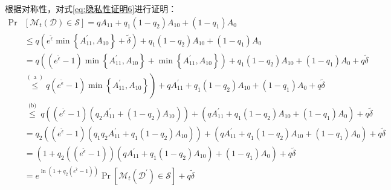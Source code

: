 

{}
根据对称性，对式\ref{eq:隐私性证明6}进行证明：
\begin{equation}
\begin{aligned}
\operatorname{Pr} & {\left[\mathcal{M}_{t}(\mathcal{D}) \in \mathcal{S}\right]=q A_{11}+q_{1}\left(1-q_{2}\right) A_{10}+\left(1-q_{1}\right) A_{0} } \\
& \leq q\left(e^{\tilde{\epsilon}} \min \left\{A_{11}^{\prime}, A_{10}\right\}+\tilde{\delta}\right)+q_{1}\left(1-q_{2}\right) A_{10}+\left(1-q_{1}\right) A_{0} \\
&=q\left(\left(e^{\tilde{\epsilon}}-1\right) \min \left\{A_{11}^{\prime}, A_{10}\right\}+\min \left\{A_{11}^{\prime}, A_{10}\right\}\right)+q_{1}\left(1-q_{2}\right) A_{10}+\left(1-q_{1}\right) A_{0}+q \tilde{\delta} \\
&\left.\stackrel{(\text { a })}{\leq} q\left(e^{\tilde{\epsilon}}-1\right) \min \left\{A_{11}^{\prime}, A_{10}\right\}\right)+q A_{11}^{\prime}+q_{1}\left(1-q_{2}\right) A_{10}+\left(1-q_{1}\right) A_{0}+q \tilde{\delta} \\
& \stackrel{\text { (b) }}{\leq} q\left(\left(e^{\tilde{\epsilon}}-1\right)\left(q_{2} A_{11}^{\prime}+\left(1-q_{2}\right) A_{10}\right)\right)+\left(q A_{11}^{\prime}+q_{1}\left(1-q_{2}\right) A_{10}+\left(1-q_{1}\right) A_{0}\right)+q \tilde{\delta} \\
&=q_{2}\left(\left(e^{\tilde{\epsilon}}-1\right)\left(q_{1} q_{2} A_{11}^{\prime}+q_{1}\left(1-q_{2}\right) A_{10}\right)\right)+\left(q A_{11}^{\prime}+q_{1}\left(1-q_{2}\right) A_{10}+\left(1-q_{1}\right) A_{0}\right)+q \tilde{\delta} \\
&=\left(1+q_{2}\left(\left(e^{\tilde{\epsilon}}-1\right)\right)\left(q A_{11}^{\prime}+q_{1}\left(1-q_{2}\right) A_{10}\right)+\left(1-q_{1}\right) A_{0}\right)+q \tilde{\delta} \\
&=e^{\ln \left(1+q_{2}\left(e^{\tilde{\epsilon}}-1\right)\right)} \operatorname{Pr}\left[\mathcal{M}_{t}\left(\mathcal{D}^{\prime}\right) \in \mathcal{S}\right]+q \tilde{\delta}
\end{aligned}
\end{equation}

